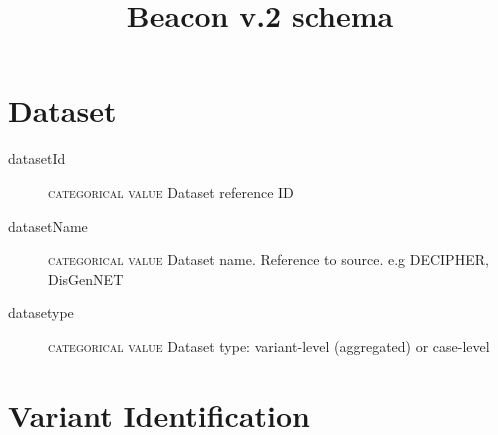 \documentclass[a4paper, 10pt]{article}        %
\begin{document}
\title{Beacon v.2 schema}
\date{} %
\maketitle





 \section*{{\color{teal}Dataset}}
 \begin{description}
  	\item[datasetId] {\textsc{categorical value}} Dataset reference ID
	\item[datasetName] {\textsc{categorical value}} Dataset name. Reference to source. e.g DECIPHER, DisGenNET
	\item[datasetype] {\textsc{categorical value}} Dataset type: variant-level (aggregated) or case-level 
  \end{description}


\section*{{\color{teal}Variant Identification}}

\end{document}
